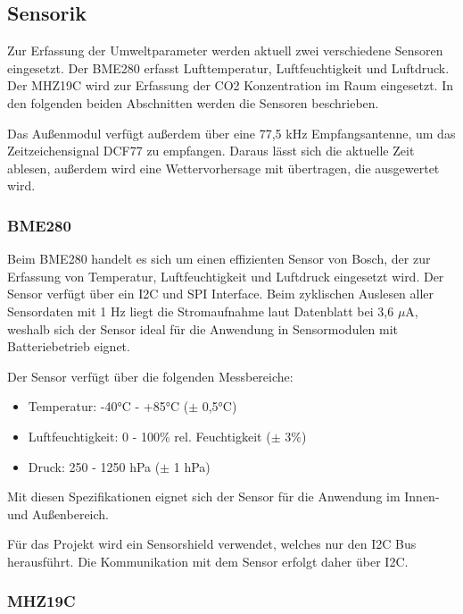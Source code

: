 \documentclass[a4paper,11pt]{article}
\begin{document}
\subsection{Sensorik}
\label{subsub:sensorik}

Zur Erfassung der Umweltparameter werden aktuell zwei verschiedene Sensoren eingesetzt. Der BME280 erfasst Lufttemperatur, Luftfeuchtigkeit und Luftdruck. 
Der MHZ19C wird zur Erfassung der CO2 Konzentration im Raum eingesetzt. In den folgenden beiden Abschnitten werden die Sensoren beschrieben. 

\vspace{0.2cm}
\noindent
Das Außenmodul verfügt außerdem über eine 77,5 kHz Empfangsantenne, um das Zeitzeichensignal DCF77 zu empfangen. Daraus lässt sich die aktuelle Zeit ablesen,
außerdem wird eine Wettervorhersage mit übertragen, die ausgewertet wird. 

\subsubsection{BME280}
\label{subsubsub:bme280}

Beim BME280 handelt es sich um einen effizienten Sensor von Bosch, der zur Erfassung von Temperatur, Luftfeuchtigkeit und Luftdruck eingesetzt wird. 
Der Sensor verfügt über ein I2C und SPI Interface.
Beim zyklischen Auslesen aller Sensordaten mit 1 Hz liegt die Stromaufnahme laut Datenblatt bei 3,6 $\mu$A, weshalb sich der Sensor ideal für die Anwendung in Sensormodulen mit Batteriebetrieb eignet. 

Der Sensor verfügt über die folgenden Messbereiche:
\begin{itemize}
  \item Temperatur: -40°C - +85°C ($\pm$ 0,5°C)
  \item Luftfeuchtigkeit: 0 - 100\% rel. Feuchtigkeit ($\pm$ 3\%)
  \item Druck: 250 - 1250 hPa ($\pm$ 1 hPa)
\end{itemize}

\noindent
Mit diesen Spezifikationen eignet sich der Sensor für die Anwendung im Innen- und Außenbereich. 

\noindent
Für das Projekt wird ein Sensorshield verwendet, welches nur den I2C Bus herausführt. Die Kommunikation mit dem Sensor erfolgt daher über I2C. 

\subsubsection{MHZ19C}
\label{subsubsub:mhz19c}
\end{document}
